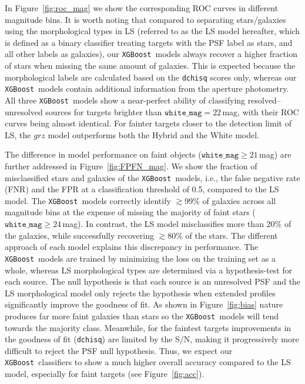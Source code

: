 \documentclass[twocolumn,tighten]{aastex631}
\newcommand{\xgboost}{\texttt{XGBoost}}
\begin{document}
\begin{CJK*}{UTF8}{gbsn}
In Figure~\ref{fig:roc_mag} we show the corresponding ROC curves in different magnitude bins. It is worth noting that compared to separating stars/galaxies using the morphological types in LS (referred to as the LS model hereafter, which is defined as a binary classifier treating targets with the PSF label as stars, and all other labels as galaxies), our \xgboost\ models always recover a higher fraction of stars when missing the same amount of galaxies. This is expected because the morphological labels are calculated based on the \texttt{dchisq} scores only, whereas our \xgboost\ models contain additional information from the aperture photometry.
All three \xgboost\ models show a near-perfect ability of classifying resolved--unresolved sources for targets brighter than $\texttt{white\_mag}=22$\,mag, with their ROC curves being almost identical. For fainter targets closer to the detection limit of LS, the $grz$ model outperforms both the Hybrid and the White model.

The difference in model performance on faint objects ($\texttt{white\_mag}\ge21$\,mag) are further addressed in Figure~\ref{fig:FPFN_mag}. We show the fraction of misclassified stars and galaxies of the \xgboost\ models, i.e., the false negative rate (FNR) and the FPR at a classification threshold of 0.5, compared to the LS model. The \xgboost\ models correctly identify $\gtrsim$99\% of galaxies across all magnitude bins at the expense of missing the majority of faint stars ($\texttt{white\_mag}\ge24$\,mag). In contrast, the LS model misclassifies more than 20\% of the galaxies, while successfully recovering $\gtrsim$80\% of the stars. The different approach of each model explains this discrepancy in performance. The \xgboost\ models are trained by minimizing the loss on the training set as a whole, whereas LS morphological types are determined via a hypothesis-test for each source. The null hypothesis is that each source is an unresolved PSF and the LS morphological model only rejects the hypothesis when extended profiles significantly improve the goodness of fit. As shown in Figure~\ref{fig:bias} nature produces far more faint galaxies than stars so the \xgboost\ models will tend towards the majority class. Meanwhile, for the faintest targets improvements in the goodness of fit (\texttt{dchisq}) are limited by the S/N, making it progressively more difficult to reject the PSF null hypothesis. Thus, we expect our \xgboost\ classifiers to show a much higher overall accuracy compared to the LS model, especially for faint targets (see Figure~\ref{fig:acc}).


\end{CJK*}
\end{document}
